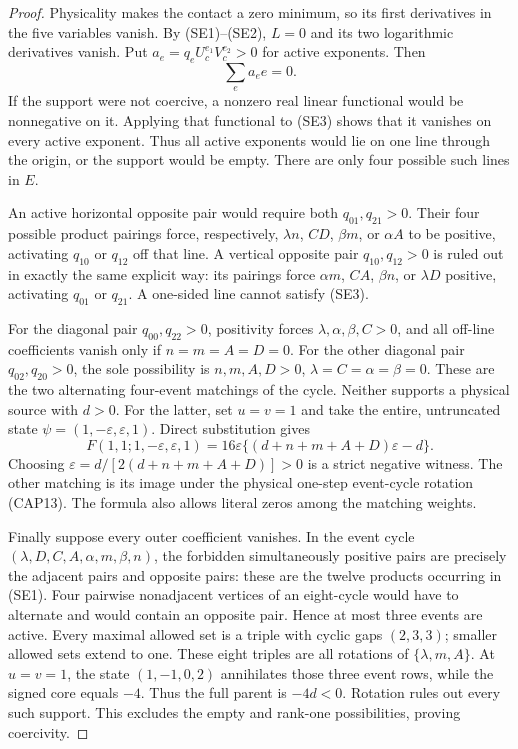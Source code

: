 \begin{proof}
Physicality makes the contact a zero minimum, so its first derivatives
in the five variables vanish.  By (SE1)--(SE2), $L=0$ and its two
logarithmic derivatives vanish.  Put
$a_e=q_eU_c^{e_1}V_c^{e_2}>0$ for active exponents.  Then
\[
\sum_ea_e e=0.
\tag{SE3}
\]
If the support were not coercive, a nonzero real linear functional
would be nonnegative on it.  Applying that functional to (SE3) shows
that it vanishes on every active exponent.  Thus all active exponents
would lie on one line through the origin, or the support would be empty.
There are only four possible such lines in $E$.

An active horizontal opposite pair would require both
$q_{01},q_{21}>0$.  Their four possible product pairings force,
respectively, $\lambda n$, $CD$, $\beta m$, or $\alpha A$ to be
positive, activating $q_{10}$ or $q_{12}$ off that line.  A vertical
opposite pair $q_{10},q_{12}>0$ is ruled out in exactly the same
explicit way: its pairings force $\alpha m$, $CA$, $\beta n$, or
$\lambda D$ positive, activating $q_{01}$ or $q_{21}$.  A
one-sided line cannot satisfy (SE3).

For the diagonal pair $q_{00},q_{22}>0$, positivity forces
$\lambda,\alpha,\beta,C>0$, and all off-line coefficients vanish
only if $n=m=A=D=0$.  For the other diagonal pair
$q_{02},q_{20}>0$, the sole possibility is
$n,m,A,D>0$, $\lambda=C=\alpha=\beta=0$.
These are the two alternating four-event matchings of the cycle.
Neither supports a physical source with $d>0$.  For the latter, set
$u=v=1$ and take the entire, untruncated state
$\psi=(1,-\varepsilon,\varepsilon,1)$.  Direct substitution gives
\[
F(1,1;1,-\varepsilon,\varepsilon,1)
 =16\varepsilon\{(d+n+m+A+D)\varepsilon-d\}.
\tag{SE4}
\]
Choosing $\varepsilon=d/[2(d+n+m+A+D)]>0$ is a strict negative
witness.  The other matching is its image under the physical one-step
event-cycle rotation (CAP13).  The formula also allows literal zeros
among the matching weights.

Finally suppose every outer coefficient vanishes.  In the event cycle
$(\lambda,D,C,A,\alpha,m,\beta,n)$, the forbidden simultaneously
positive pairs are precisely the adjacent pairs and opposite pairs:
these are the twelve products occurring in (SE1).  Four pairwise
nonadjacent vertices of an eight-cycle would have to alternate and
would contain an opposite pair.  Hence at most three events are active.
Every maximal allowed set is a triple with cyclic gaps $(2,3,3)$;
smaller allowed sets extend to one.  These eight triples are all rotations
of $\{\lambda,m,A\}$.  At $u=v=1$, the state $(1,-1,0,2)$
annihilates those three event rows, while the signed core equals $-4$.
Thus the full parent is $-4d<0$.  Rotation rules out every such support.
This excludes the empty and rank-one possibilities, proving coercivity.


\end{proof}
